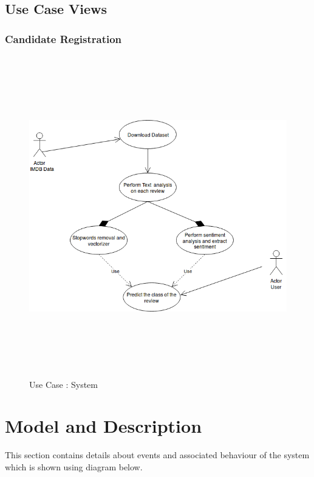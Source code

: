 \documentclass[oneside,a4paper,12pt]{pictreport}
\begin{document}
\subsection{Use Case Views}
\subsubsection{Candidate Registration}
\begin{figure}[h!]
\includegraphics[width=5.2in,height=5.5in]{use_case.png}
\caption{Use Case : System}
\end{figure}
\newpage
\section{Model and Description}
This section contains details about events and associated behaviour of the system which is shown using diagram below.
\end{document}
